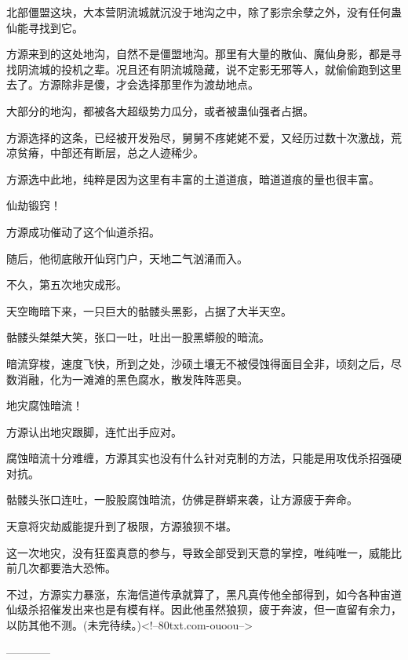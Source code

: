 \begin{this_body}
北部僵盟这块，大本营阴流城就沉没于地沟之中，除了影宗余孽之外，没有任何蛊仙能寻找到它。

方源来到的这处地沟，自然不是僵盟地沟。那里有大量的散仙、魔仙身影，都是寻找阴流城的投机之辈。况且还有阴流城隐藏，说不定影无邪等人，就偷偷跑到这里去了。方源除非是傻，才会选择那里作为渡劫地点。

大部分的地沟，都被各大超级势力瓜分，或者被蛊仙强者占据。

方源选择的这条，已经被开发殆尽，舅舅不疼姥姥不爱，又经历过数十次激战，荒凉贫瘠，中部还有断层，总之人迹稀少。

方源选中此地，纯粹是因为这里有丰富的土道道痕，暗道道痕的量也很丰富。

仙劫锻窍！

方源成功催动了这个仙道杀招。

随后，他彻底敞开仙窍门户，天地二气汹涌而入。

不久，第五次地灾成形。

天空晦暗下来，一只巨大的骷髅头黑影，占据了大半天空。

骷髅头桀桀大笑，张口一吐，吐出一股黑蟒般的暗流。

暗流穿梭，速度飞快，所到之处，沙硕土壤无不被侵蚀得面目全非，顷刻之后，尽数消融，化为一滩滩的黑色腐水，散发阵阵恶臭。

地灾腐蚀暗流！

方源认出地灾跟脚，连忙出手应对。

腐蚀暗流十分难缠，方源其实也没有什么针对克制的方法，只能是用攻伐杀招强硬对抗。

骷髅头张口连吐，一股股腐蚀暗流，仿佛是群蟒来袭，让方源疲于奔命。

天意将灾劫威能提升到了极限，方源狼狈不堪。

这一次地灾，没有狂蛮真意的参与，导致全部受到天意的掌控，唯纯唯一，威能比前几次都要浩大恐怖。

不过，方源实力暴涨，东海信道传承就算了，黑凡真传他全部得到，如今各种宙道仙级杀招催发出来也是有模有样。因此他虽然狼狈，疲于奔波，但一直留有余力，以防其他不测。(未完待续。)<!--80txt.com-ouoou-->

------------

\end{this_body}

